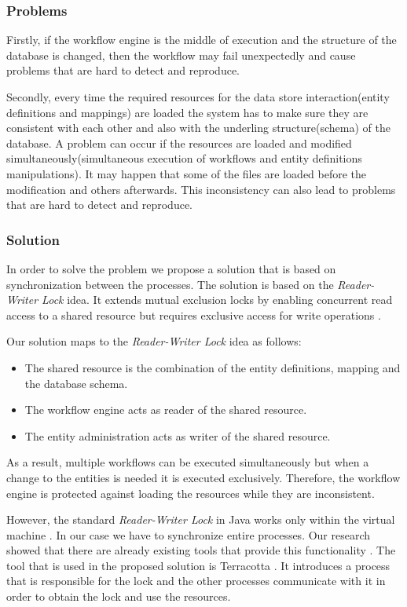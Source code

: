 \subsubsection{Problems}
Firstly, if the workflow engine is the middle of execution and the structure of the database is changed, then the workflow may fail unexpectedly and cause problems that are hard to detect and reproduce. 

Secondly, every time the required resources for the data store interaction(entity definitions and mappings) are loaded the system has to make sure they are consistent with each other and also with the underling structure(schema) of the database. A problem can occur if the resources are loaded and modified simultaneously(simultaneous execution of workflows and entity definitions manipulations). It may happen that some of the files are loaded before the modification and others afterwards. This inconsistency can also lead to problems that are hard to detect and reproduce.

\subsubsection{Solution}

In order to solve the problem we propose a solution that is based on synchronization between the processes. The solution is based on the \textit{Reader-Writer Lock} idea. It extends mutual exclusion locks by enabling concurrent read access to a shared resource but requires exclusive access for write operations \cite{Lev}.

Our solution maps to the \textit{Reader-Writer Lock} idea as follows:
\begin{itemize}
	\item The shared resource is the combination of the entity definitions, mapping and the database schema.
	\item The workflow engine acts as reader of the shared resource.
	\item The entity administration acts as writer of the shared resource.
\end{itemize}
As a result, multiple workflows can be executed simultaneously but when a change to the entities is needed it is executed exclusively. Therefore, the workflow engine is protected against loading the resources while they are inconsistent.

However, the standard \textit{Reader-Writer Lock} in Java works only within the virtual machine \cite{javadocs}. In our case we have to synchronize entire processes. Our research showed that there are already existing tools that provide this functionality \cite{Hernane}. The tool that is used in the proposed solution is Terracotta \cite{terracotta}. It introduces a process that is responsible for the lock and the other processes communicate with it in order to obtain the lock and use the resources.


